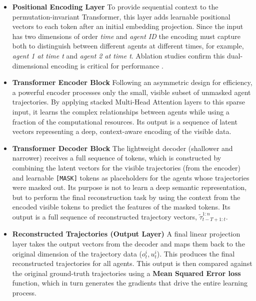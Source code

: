 \begin{description}
\begin{itemize}
    \item \textbf{Positional Encoding Layer}  To provide sequential context to the permutation-invariant Transformer, this layer adds learnable positional vectors to each token after   an initial embedding projection. Since the input has two dimensions of order \textit{time} and \textit{agent ID} the encoding must capture both to distinguish between different agents at different times, for example, \textit{agent 1 at time t} and \textit{agent 2 at time t}. Ablation studies confirm this dual-dimensional encoding is critical for performance \parencite{ma2e}.
    \item \textbf{Transformer Encoder Block} Following an asymmetric design for efficiency, a powerful encoder processes only the small, visible subset of unmasked agent trajectories. By applying stacked Multi-Head Attention layers to this sparse input, it learns the complex relationships between agents while using a fraction of the computational resources. Its output is a sequence of latent vectors representing a deep, context-aware encoding of the visible data.
    \item  \textbf{Transformer Decoder Block} The lightweight decoder (shallower and narrower) receives a full sequence of tokens, which is constructed by combining the latent vectors for the visible trajectories (from the encoder) and learnable \texttt{[MASK]} tokens as placeholders for the agents whose trajectories were masked out. Its purpose is not to learn a deep semantic representation, but to perform the final reconstruction task by using the context from the encoded visible tokens to predict the features of the masked tokens. Its output is a full sequence of reconstructed trajectory vectors, $\tilde{\tau}_{t-T+1:t}^{1:n}$.
    \item \textbf{Reconstructed Trajectories (Output Layer)} A final linear projection layer takes the output vectors from the decoder and maps them back to the original dimension of the trajectory data ($o_t^i, u_t^i$). This produces the final reconstructed trajectories for all agents. This output is then compared against the original ground-truth trajectories using a \textbf{Mean Squared Error  loss } function, which in turn generates the gradients that drive the entire learning process.


\end{itemize}
\end{description}
